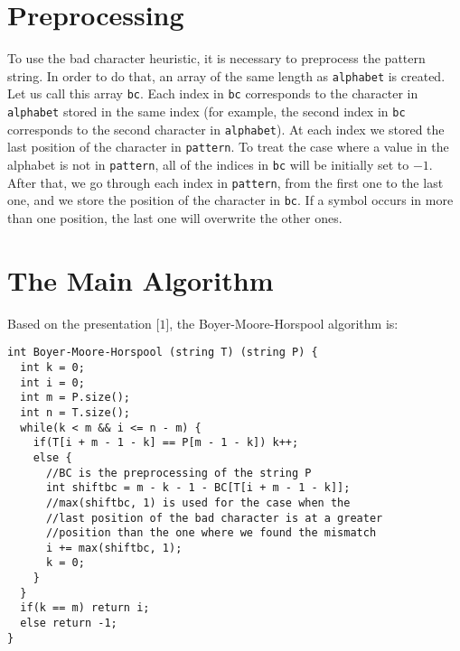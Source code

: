 \section{Preprocessing}

To use the bad character heuristic, it is necessary to preprocess the pattern string. In order to do that, an array of the same length as \texttt{alphabet} is created. Let us call this array \texttt{bc}. Each index in \texttt{bc} corresponds to the character in \texttt{alphabet} stored in the same index (for example, the second index in \texttt{bc} corresponds to the second character in \texttt{alphabet}). At each index we stored the last position of the character in \texttt{pattern}. To treat the case where a value in the alphabet is not in \texttt{pattern}, all of the indices in \texttt{bc} will be initially set to \(-1\). After that, we go through each index in \texttt{pattern}, from the first one to the last one, and we store the position of the character in \texttt{bc}. If a symbol occurs in more than one position, the last one will overwrite the other ones.

\section{The Main Algorithm}

Based on the presentation [\(1\)], the Boyer-Moore-Horspool algorithm is:

\begin{verbatim}
int Boyer-Moore-Horspool (string T) (string P) {
  int k = 0;
  int i = 0;
  int m = P.size();
  int n = T.size();
  while(k < m && i <= n - m) {
    if(T[i + m - 1 - k] == P[m - 1 - k]) k++;
    else {
      //BC is the preprocessing of the string P
      int shiftbc = m - k - 1 - BC[T[i + m - 1 - k]];
      //max(shiftbc, 1) is used for the case when the
      //last position of the bad character is at a greater 
      //position than the one where we found the mismatch
      i += max(shiftbc, 1);
      k = 0;
    }
  }
  if(k == m) return i;
  else return -1;
}
\end{verbatim}

